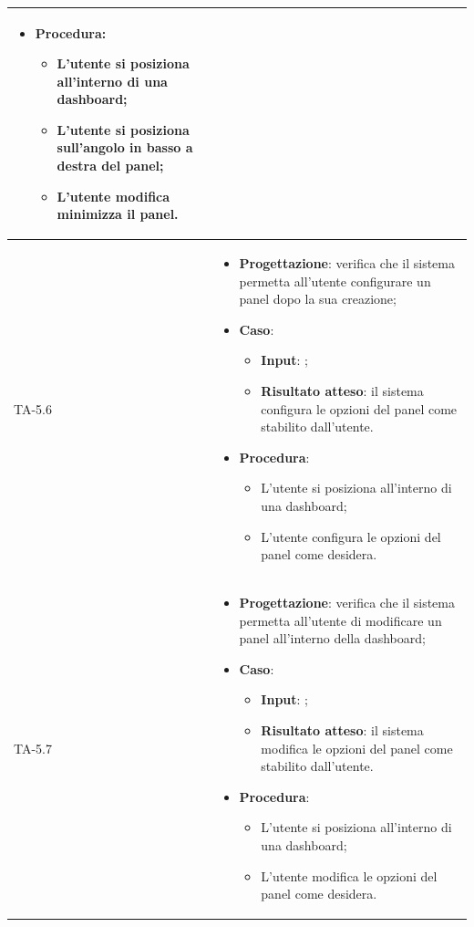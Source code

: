 \begin{longtable}{|C{2.5cm}|C{13cm}|}
\begin{itemize}
\begin{itemize}
	\end{itemize}
	\item \textbf{Procedura}:
	\begin{itemize}
		\item L'utente si posiziona all'interno di una dashboard;
		\item L'utente si posiziona sull'angolo in basso a destra del panel;
		\item L'utente modifica minimizza il panel.
	\end{itemize} 
\end{itemize} \\
\hline
{TA-5.6} &
\begin{itemize}
	\item \textbf{Progettazione}: verifica che il sistema permetta all'utente configurare un panel dopo la sua creazione;
	\item \textbf{Caso}: 
	\begin{itemize}
		\item \textbf{Input}: ;
		\item \textbf{Risultato atteso}: il sistema configura le opzioni del panel come stabilito dall'utente.
	\end{itemize}
	\item \textbf{Procedura}:
	\begin{itemize}
		\item L'utente si posiziona all'interno di una dashboard;
		\item L'utente configura le opzioni del panel come desidera.
	\end{itemize} 
\end{itemize} \\
\hline
{TA-5.7} &
\begin{itemize}
	\item \textbf{Progettazione}: verifica che il sistema permetta all'utente di modificare un panel all'interno della dashboard;
	\item \textbf{Caso}: 
	\begin{itemize}
		\item \textbf{Input}: ;
		\item \textbf{Risultato atteso}: il sistema modifica le opzioni del panel come stabilito dall'utente.
	\end{itemize}
	\item \textbf{Procedura}:
	\begin{itemize}
		\item L'utente si posiziona all'interno di una dashboard;
		\item L'utente modifica le opzioni del panel come desidera.

\end{itemize}
\end{itemize}
\end{longtable}
